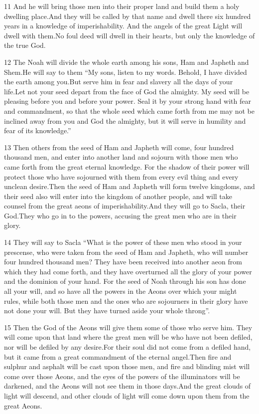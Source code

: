 \par 11 And he will bring those men into their proper land and build them a holy dwelling place.And they will be called by that name and dwell there six hundred years in a knowledge of imperishability. And the angels of the great Light will dwell with them.No foul deed will dwell in their hearts, but only the knowledge of the true God.

\par 12 The Noah will divide the whole earth among his sons, Ham and Japheth and Shem.He will say to them “My sons, listen to my words. Behold, I have divided the earth among you.But serve him in fear and slavery all the days of your life.Let not your seed depart from the face of God the almighty. My seed will be pleasing before you and before your power. Seal it by your strong hand with fear and commandment, so that the whole seed which came forth from me may not be inclined away from you and God the almighty, but it will serve in humility and fear of its knowledge.”

\par 13 Then others from the seed of Ham and Japheth will come, four hundred thousand men, and enter into another land and sojourn with those men who came forth from the great eternal knowledge. For the shadow of their power will protect those who have sojourned with them from every evil thing and every unclean desire.Then the seed of Ham and Japheth will form twelve kingdoms, and their seed also will enter into the kingdom of another people, and will take counsel from the great aeons of imperishability.And they will go to Sacla, their God.They who go in to the powers, accusing the great men who are in their glory.

\par 14 They will say to Sacla “What is the power of these men who stood in your prescense, who were taken from the seed of Ham and Japheth, who will number four hundred thousand men? They have been received into another aeon from which they had come forth, and they have overturned all the glory of your power and the dominion of your hand. For the seed of Noah through his son has done all your will, and so have all the powers in the Aeons over which your might rules, while both those men and the ones who are sojourners in their glory have not done your will. But they have turned aside your whole throng”.

\par 15 Then the God of the Aeons will give them some of those who serve him. They will come upon that land where the great men will be who have not been defiled, nor will be defiled by any desire.For their soul did not come from a defiled hand, but it came from a great commandment of the eternal angel.Then fire and sulphur and asphalt will be cast upon those men, and fire and blinding mist will come over those Aeons, and the eyes of the powers of the illuminators will be darkened, and the Aeons will not see them in those days.And the great clouds of light will descend, and other clouds of light will come down upon them from the great Aeons.

